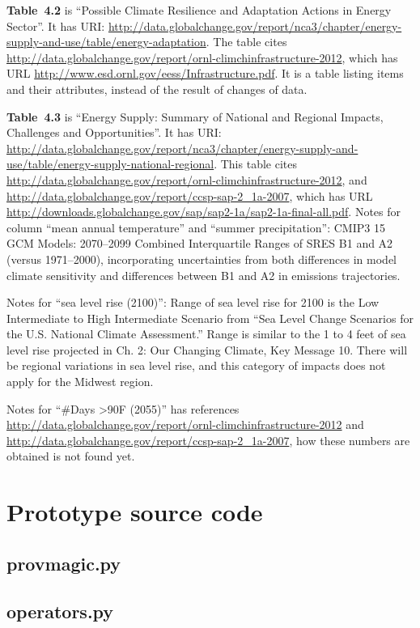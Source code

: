 \mbox{}

\textbf{Table~4.2} is ``Possible Climate Resilience and Adaptation Actions in Energy Sector''. It has URI: \url{http://data.globalchange.gov/report/nca3/chapter/energy-supply-and-use/table/energy-adaptation}.
The table cites \url{http://data.globalchange.gov/report/ornl-climchinfrastructure-2012}, which has URL \url{http://www.esd.ornl.gov/eess/Infrastructure.pdf}.
It is a table listing items and their attributes, instead of the result of changes of data.

\textbf{Table~4.3} is ``Energy Supply: Summary of National and Regional Impacts, Challenges and Opportunities''. It has
URI: \url{http://data.globalchange.gov/report/nca3/chapter/energy-supply-and-use/table/energy-supply-national-regional}.
This table cites \url{http://data.globalchange.gov/report/ornl-climchinfrastructure-2012}, and \url{http://data.globalchange.gov/report/ccsp-sap-2_1a-2007}, which has URL \url{http://downloads.globalchange.gov/sap/sap2-1a/sap2-1a-final-all.pdf}.
Notes for column ``mean annual temperature'' and ``summer precipitation'': CMIP3 15 GCM Models: 2070--2099 Combined Interquartile Ranges of SRES B1 and A2 (versus 1971--2000), incorporating uncertainties from both differences in model climate sensitivity and differences between B1 and A2 in emissions trajectories.

Notes for ``sea level rise (2100)'': Range of sea level rise for 2100 is the Low Intermediate to High Intermediate Scenario from ``Sea Level Change Scenarios for the U.S. National Climate Assessment.'' Range is similar to the 1 to 4 feet of sea level rise projected in Ch. 2: Our Changing Climate, Key Message 10. There will be regional variations in sea level rise, and this category of impacts does not apply for the Midwest region.

Notes for ``\#Days >90F (2055)'' has references \url{http://data.globalchange.gov/report/ornl-climchinfrastructure-2012} and \url{http://data.globalchange.gov/report/ccsp-sap-2_1a-2007}, how these numbers are obtained is not found yet.

\chapter{Prototype source code}
\section{provmagic.py}

\section{operators.py}

